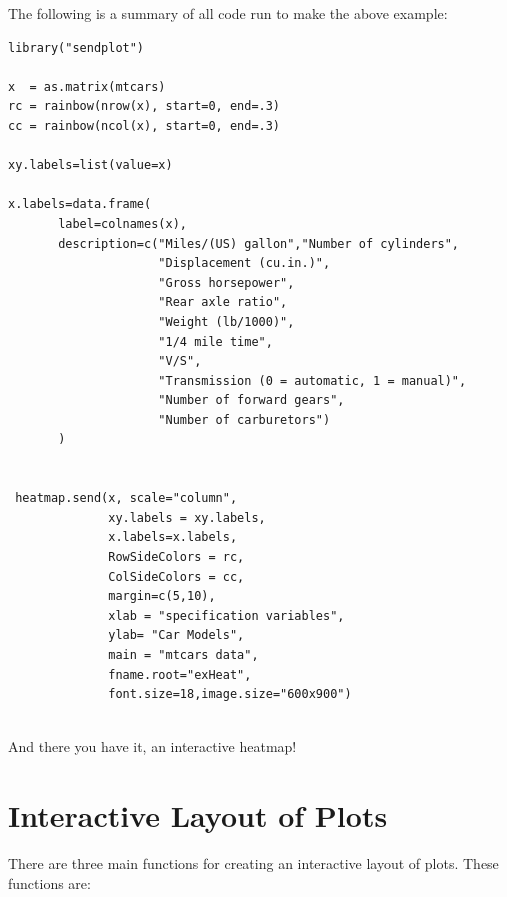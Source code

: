 \documentclass[]{article}
\begin{document}
 
The following is a summary of all code run to make the above example:

\begin{verbatim}
library("sendplot")

x  = as.matrix(mtcars)
rc = rainbow(nrow(x), start=0, end=.3)
cc = rainbow(ncol(x), start=0, end=.3)

xy.labels=list(value=x)

x.labels=data.frame(
       label=colnames(x),
       description=c("Miles/(US) gallon","Number of cylinders",
                     "Displacement (cu.in.)",
                     "Gross horsepower",
                     "Rear axle ratio",
                     "Weight (lb/1000)",
                     "1/4 mile time",
                     "V/S",
                     "Transmission (0 = automatic, 1 = manual)",
                     "Number of forward gears",
                     "Number of carburetors")
       ) 


 heatmap.send(x, scale="column",
              xy.labels = xy.labels,
              x.labels=x.labels,
              RowSideColors = rc,
              ColSideColors = cc, 
              margin=c(5,10),
              xlab = "specification variables", 
              ylab= "Car Models",
              main = "mtcars data",
              fname.root="exHeat", 
              font.size=18,image.size="600x900")


\end{verbatim}


And there you have it, an interactive heatmap! 


\newpage





























\section{Interactive Layout of Plots}

\indent There are three main functions for creating an interactive layout of plots. These functions are:
\end{document}
